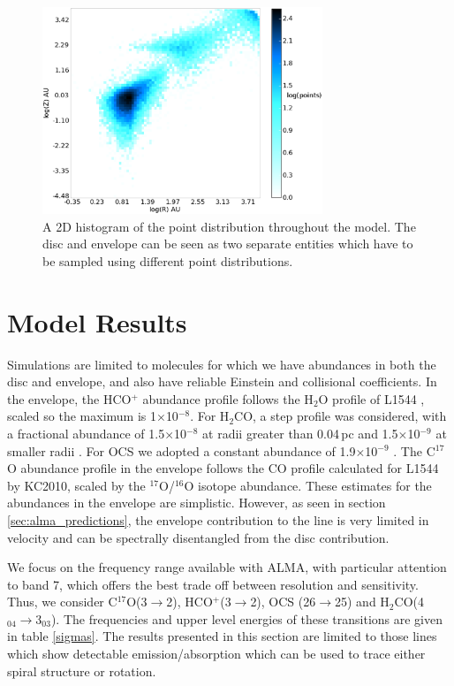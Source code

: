 \documentclass[useAMS,usenatbib]{mn2e}
\begin{document}
\begin{figure}
 \includegraphics[width=84mm]{Figures/model/lime_points_rz_histo3.eps}
 \caption{A 2D histogram of the point distribution throughout the model. The disc and envelope can be seen as two separate entities which have to be sampled using different point distributions.}
 \label{points}
\end{figure}


\section{Model Results} \label{sec:model_results}

Simulations are limited to molecules for which we have abundances in both the disc and envelope, and also have reliable Einstein and collisional coefficients. In the envelope, the HCO$^+$ abundance profile follows the H$_2$O profile of L1544 \citep{Caselli2012}, scaled so the maximum is 1$\times$10$^{-8}$. For H$_2$CO, a step profile was considered, with a fractional abundance of 1.5$\times$10$^{-8}$ at radii greater than 0.04$\,$pc and 1.5$\times$10$^{-9}$ at smaller radii \citep{Young2004}. For OCS we adopted a constant abundance of 1.9$\times$10$^{-9}$ \citep{Ren2011}. The C$^{17}$O abundance profile in the envelope follows the CO profile calculated for L1544 by KC2010, scaled by the $^{17}$O/$^{16}$O isotope abundance. These estimates for the abundances in the envelope are simplistic. However, as seen in section \ref{sec:alma_predictions}, the envelope contribution to the line is very limited in velocity and can be spectrally disentangled from the disc contribution.\smallskip

We focus on the frequency range available with ALMA, with particular attention to band 7, which offers the best trade off between resolution and sensitivity. Thus, we consider C$^{17}$O(3$\rightarrow$2), HCO$^+$(3$\rightarrow$2), OCS (26$\rightarrow$25) and H$_2$CO(4$_{04}\rightarrow$3$_{03}$).  The frequencies and upper level energies of these transitions are given in table \ref{sigmas}. The results presented in this section are limited to those lines which show detectable emission/absorption which can be used to trace either spiral structure or rotation.\smallskip
\end{document}

